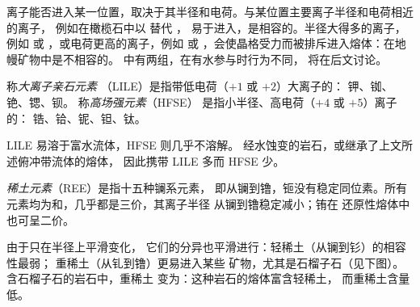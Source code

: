 离子能否进入某一位置，取决于其半径和电荷。与某位置主要离子半径和电荷相近的离子，
例如在橄榄石中以  替代 ，
易于进入，是相容的。半径大得多的离子，例如
 或 ，或电荷更高的离子，例如  或
，会使晶格受力而被排斥进入熔体：在地幔矿物中是不相容的。
中有两组，在有水参与时行为不同，
将在后文讨论。

\begin{definition}[大离子亲石元素与高场强元素]
\label{def:b2:elements-in-the-earth:lile-hfse}
称\emph{大离子亲石元素}
（LILE）是指带低电荷（$+1$ 或 $+2$）大离子的：
钾、铷、铯、锶、钡。
称\emph{高场强元素}（HFSE）
是指小半径、高电荷（$+4$ 或 $+5$）离子的：
锆、铪、铌、钽、钛。
\end{definition}

LILE 易溶于富水流体，HFSE 则几乎不溶解。
经水蚀变的岩石，或继承了上文所述俯冲带流体的熔体，
因此携带 LILE 多而 HFSE 少。

\begin{definition}[稀土元素]\label{def:b2:elements-in-the-earth:ree}
\emph{稀土元素}（REE）是指十五种镧系元素，
即从镧到镥，钷没有稳定同位素。所有
元素均为和，几乎都是三价，其离子半径
从镧到镥稳定减小；铕在
还原性熔体中也可呈二价。
\end{definition}

由于只在半径上平滑变化，
它们的分异也平滑进行：轻稀土（从镧到钐）的相容性最弱；
重稀土（从钆到镥）更易进入某些
矿物，尤其是石榴子石（见下图）。含石榴子石的岩石中，重稀土
变为：这种岩石的熔体富含轻稀土，
而重稀土含量低。

